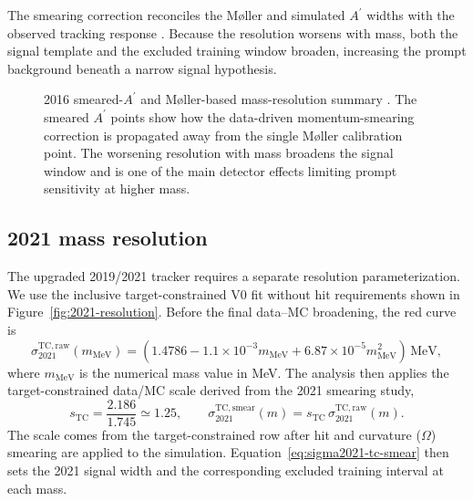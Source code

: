 The smearing correction reconciles the M{\o}ller and simulated $A^\prime$ widths with
the observed tracking response \cite{HPS2016BumpInternal,HPS2016PromptLong}. Because
the resolution worsens with mass, both the signal template and the excluded training
window broaden, increasing the prompt background beneath a narrow signal hypothesis.

\begin{figure}[H]
\centering
{}
\caption{2016 smeared-$A^\prime$ and M{\o}ller-based mass-resolution summary
\cite{HPS2016BumpInternal}. The smeared $A^\prime$ points show how the data-driven
momentum-smearing correction is propagated away from the single M{\o}ller calibration
point. The worsening resolution with mass broadens the signal window and is one of the
main detector effects limiting prompt sensitivity at higher mass.}
\label{fig:2016-resolution}
\end{figure}

\subsection{2021 mass resolution}
\label{sec:massres-2021}

The upgraded 2019/2021 tracker requires a separate resolution parameterization. We use
the inclusive target-constrained V0 fit without hit requirements shown in
Figure~\ref{fig:2021-resolution}. Before the final data--MC broadening, the red curve is
\begin{equation}
\sigma_{2021}^{\mathrm{TC,raw}}(m_{\mathrm{MeV}})
= \left(1.4786 - 1.1\times10^{-3}m_{\mathrm{MeV}}
  + 6.87\times10^{-5}m_{\mathrm{MeV}}^2\right)\,\mathrm{MeV},
\label{eq:sigma2021}
\end{equation}
where $m_{\mathrm{MeV}}$ is the numerical mass value in MeV. The analysis then applies the
target-constrained data/MC scale derived from the 2021 smearing study,
\begin{equation}
s_{\mathrm{TC}} = \frac{2.186}{1.745} \simeq 1.25,
\qquad
\sigma_{2021}^{\mathrm{TC,smear}}(m)
= s_{\mathrm{TC}}\,\sigma_{2021}^{\mathrm{TC,raw}}(m).
\label{eq:sigma2021-tc-smear}
\end{equation}
The scale comes from the target-constrained row after hit and curvature ($\Omega$)
smearing are applied to the simulation. Equation~\ref{eq:sigma2021-tc-smear} then sets
the 2021 signal width and the corresponding excluded training interval at each mass.

